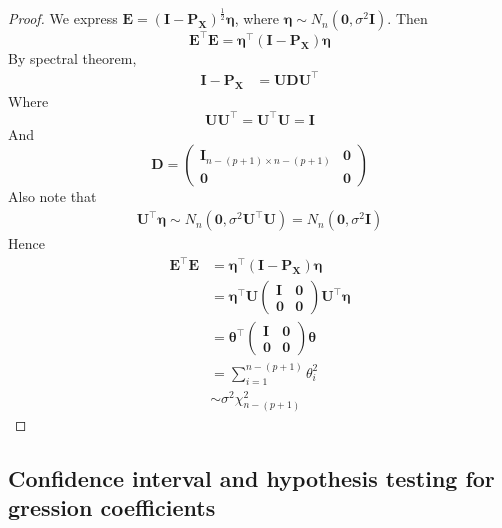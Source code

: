 \begin{proof}
We express $\bm{E} = \left( \bm{I} - \bm{P_X} \right)^{ \frac{1}{2}} \bm{\eta} $, where $\bm{\eta} \sim N_n \left( \bm{0}, \sigma^2 \bm{I} \right) $. Then 
\[
    \bm{E}^{\top}\bm{E} = \bm{\eta}^{\top} \left( \bm{I} - \bm{P_X} \right) \bm{\eta}
\]
By spectral theorem, 
\begin{align*}
    \bm{I} - \bm{P_X} &= \bm{UD}  \bm{U}^{\top}
\end{align*}
Where 
\[
    \bm{UU}^{\top} = \bm{U}^{\top}\bm{U} = \bm{I}
\]
And 
\[
    \bm{D} = \begin{pmatrix} 
      \bm{I}_{n - (p + 1) \times n - (p + 1)} & \bm{0} \\
      \bm{0} & \bm{0}
    \end{pmatrix}
\]
Also note that 
\begin{align*}
    \bm{U}^{\top} \bm{\eta} \sim N_n \left( \bm{0}, \sigma^2 \bm{U}^{\top} \bm{U} \right)  = N_n \left( \bm{0}, \sigma^2 \bm{I} \right) 
\end{align*}
Hence 
\begin{align*}
    \bm{E}^{\top} \bm{E} &= \bm{\eta}^{\top} \left( \bm{I} - \bm{P_X} \right)  \bm{\eta} \\
    &= \bm{\eta}^{\top} \bm{U} \begin{pmatrix} 
      \bm{I}   & \bm{0} \\ \bm{0} & \bm{0}
    \end{pmatrix}
     \bm{U}^{\top} \bm{\eta} \\
     &= \bm{ \theta}^{\top} \begin{pmatrix} 
    \bm{I}   & \bm{0} \\ \bm{0} & \bm{0}
     \end{pmatrix}   \bm{ \theta}\\
     &= \sum\limits_{i = 1}^{n - (p + 1)}  \theta_i^2  \\
     & \sim \sigma^2 \chi^2_{n - ( p + 1)}
\end{align*}
\end{proof}


\subsection{Confidence interval and hypothesis testing for gression coefficients}

